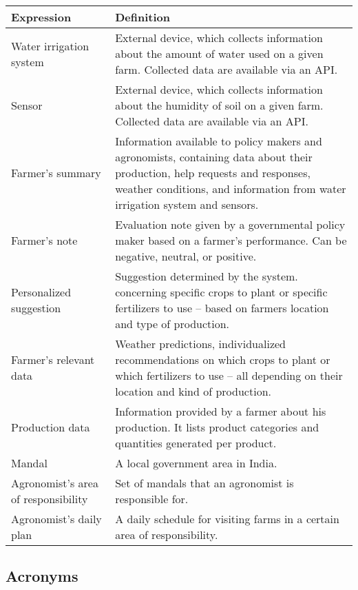 \begin{center}
	\begin{tabular}{@{}p{0.30\linewidth} p{0.70\linewidth}@{}}
		\toprule
		\textbf{Expression}     & \textbf{Definition}\\
		\midrule
		Water irrigation system & External device, which collects information about the amount of water used on a given farm. Collected data are available via an API. \\
        Sensor                  & External device, which collects information about the humidity of soil on a given farm. Collected data are available via an API.\\
        Farmer's summary        & Information available to policy makers and agronomists, containing data about their production, help requests and responses, weather conditions, and information from water irrigation system and sensors.\\
        Farmer's note           & Evaluation note given by a governmental policy maker based on a farmer's performance. Can be negative, neutral, or positive.\\
        Personalized suggestion & Suggestion determined by the system. concerning specific crops to plant or specific fertilizers to use – based on farmers location and type of production.\\
        Farmer's relevant data  & Weather predictions, individualized recommendations on which crops to plant or which fertilizers to use – all depending on their location and kind of production.\\
        Production data         & Information provided by a farmer about his production. It lists product categories and quantities generated per product.\\
        Mandal                  & A local government area in India.\\
        Agronomist's area of responsibility  & Set of mandals that an agronomist is responsible for.\\
        Agronomist's daily plan & A daily schedule for visiting farms in a certain area of responsibility.\\
	\end{tabular}
\end{center}

\subsection{Acronyms}

